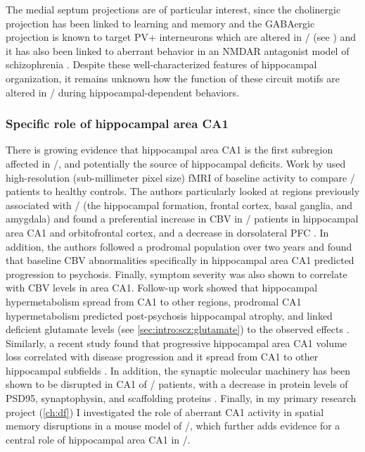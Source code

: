 The medial septum projections are of particular interest, since the cholinergic projection has been linked to learning and memory \citep{Parent2004} and the GABAergic projection is known to target PV+ interneurons \citep{Freund1988} which are altered in \scz/ (see ) and it has also been linked to aberrant behavior in an NMDAR antagonist model of schizophrenia \citep{Ma2012}.
Despite these well-characterized features of hippocampal organization, it remains unknown how the function of these circuit motifs are altered in \scz/ during hippocampal-dependent behaviors.

\subsubsection{Specific role of hippocampal area CA1}
There is growing evidence that hippocampal area CA1 is the first subregion affected in \scz/, and potentially the source of hippocampal deficits.
Work by \citeauthor{Schobel2009} used high-resolution (sub-millimeter pixel size) \ac{fMRI} of baseline activity to compare \scz/ patients to healthy controls.
The authors particularly looked at regions previously associated with \scz/ (the hippocampal formation, frontal cortex, basal ganglia, and amygdala) and found a preferential increase in \ac{CBV} in \scz/ patients in hippocampal area CA1 and orbitofrontal cortex, and a decrease in dorsolateral \ac{PFC} \citep{Schobel2009}.
In addition, the authors followed a prodromal population over two years and found that baseline \ac{CBV} abnormalities specifically in hippocampal area CA1 predicted progression to psychosis.
Finally, symptom severity was also shown to correlate with \ac{CBV} levels in area CA1.
Follow-up work showed that hippocampal hypermetabolism spread from CA1 to other regions, prodromal CA1 hypermetabolism predicted post-psychosis hippocampal atrophy, and linked deficient glutamate levels (see \autoref{sec:intro:scz:glutamate}) to the observed effects \citep{Schobel2013}.
Similarly, a recent study found that progressive hippocampal area CA1 volume loss correlated with disease progression and it spread from CA1 to other hippocampal subfields \citep{Ho2017}.
In addition, the synaptic molecular machinery has been shown to be disrupted in CA1 of \scz/ patients, with a decrease in protein levels of PSD95, synaptophysin, and scaffolding proteins \citep{Matosin2016}. 
Finally, in my primary research project (\autoref{ch:df}) I investigated the role of aberrant CA1 activity in spatial memory disruptions in a mouse model of \scz/, which further adds evidence for a central role of hippocampal area CA1 in \scz/.

